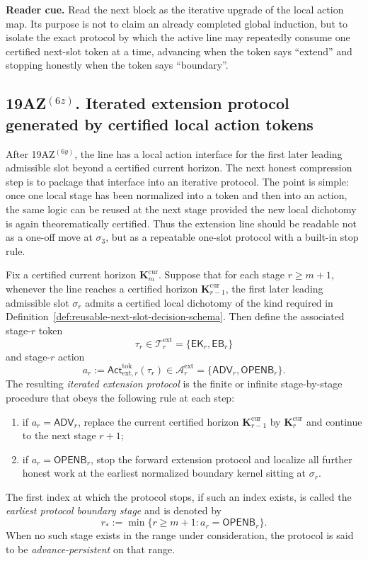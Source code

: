 \noindent\textbf{Reader cue.} Read the next block as the iterative upgrade of the local action map. Its purpose is not to claim an already completed global induction, but to isolate the exact protocol by which the active line may repeatedly consume one certified next-slot token at a time, advancing when the token says ``extend'' and stopping honestly when the token says ``boundary''.

\subsection*{19AZ$^{(6z)}$. Iterated extension protocol generated by certified local action tokens}
\label{sec:iterated-extension-protocol-generated-by-certified-local-action-tokens}
After 19AZ$^{(6y)}$, the line has a local action interface for the first later leading admissible slot beyond a certified current horizon. The next honest compression step is to package that interface into an iterative protocol. The point is simple: once one local stage has been normalized into a token and then into an action, the same logic can be reused at the next stage provided the new local dichotomy is again theorematically certified. Thus the extension line should be readable not as a one-off move at $\sigma_3$, but as a repeatable one-slot protocol with a built-in stop rule.

\begin{definition}
\label{def:iterated-extension-protocol-with-earliest-boundary-stop-rule}
Fix a certified current horizon $\mathbf K_m^{\mathrm{cur}}$. Suppose that for each stage $r\geq m+1$, whenever the line reaches a certified horizon $\mathbf K_{r-1}^{\mathrm{cur}}$, the first later leading admissible slot $\sigma_r$ admits a certified local dichotomy of the kind required in Definition~\ref{def:reusable-next-slot-decision-schema}. Then define the associated stage-$r$ token
\[
 \tau_r \in \mathcal T^{\mathrm{ext}}_r = \{\mathsf{EK}_r,\mathsf{EB}_r\}
\]
and stage-$r$ action
\[
 a_r := \mathsf{Act}^{\mathrm{tok}}_{\mathrm{ext},r}(\tau_r)
 \in \mathcal A^{\mathrm{ext}}_r = \{\mathsf{ADV}_r,\mathsf{OPENB}_r\}.
\]
The resulting \emph{iterated extension protocol} is the finite or infinite stage-by-stage procedure that obeys the following rule at each step:
\begin{enumerate}[label=(\roman*)]
 \item if $a_r=\mathsf{ADV}_r$, replace the current certified horizon $\mathbf K_{r-1}^{\mathrm{cur}}$ by $\mathbf K_r^{\mathrm{cur}}$ and continue to the next stage $r+1$;
 \item if $a_r=\mathsf{OPENB}_r$, stop the forward extension protocol and localize all further honest work at the earliest normalized boundary kernel sitting at $\sigma_r$.
\end{enumerate}
The first index at which the protocol stops, if such an index exists, is called the \emph{earliest protocol boundary stage} and is denoted by
\[
 r_* := \min\{r\ge m+1 : a_r=\mathsf{OPENB}_r\}.
\]
When no such stage exists in the range under consideration, the protocol is said to be \emph{advance-persistent} on that range.
\end{definition}

